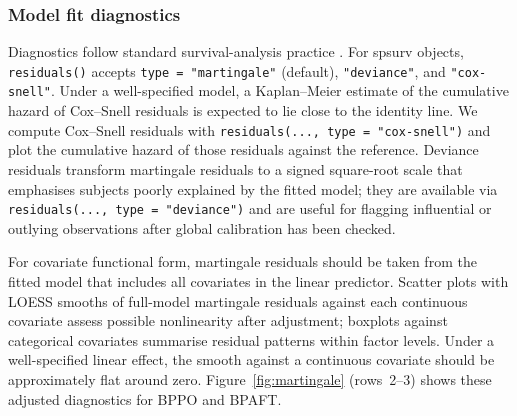 \documentclass[5p,lefttitle]{elsarticle}
\providecommand{\pkg}[1]{\textsf{#1}}
\begin{document}
{%


\subsubsection{Model fit diagnostics}\label{model-fit-diagnostics}

Diagnostics follow standard survival-analysis practice \citep{survival:2000, Collett2015}. For \pkg{spsurv} objects, \texttt{residuals()} accepts
\texttt{type\ =\ "martingale"} (default), \texttt{"deviance"}, and \texttt{"cox-snell"}.
Under a well-specified model, a Kaplan--Meier estimate of the
cumulative hazard of Cox--Snell residuals is expected to lie close to
the identity line. We compute Cox--Snell residuals with
\texttt{residuals(...,\ type\ =\ "cox-snell")} and plot the cumulative hazard of
those residuals against the reference.
Deviance residuals transform martingale residuals to a signed square-root
scale that emphasises subjects poorly explained by the fitted model; they are
available via \texttt{residuals(...,\ type\ =\ "deviance")} and are useful for
flagging influential or outlying observations after global calibration has been
checked.

For covariate functional form, martingale residuals should be taken from
the fitted model that includes all covariates in the linear predictor.
Scatter plots with LOESS smooths of full-model martingale residuals
against each continuous covariate assess possible nonlinearity after
adjustment; boxplots against categorical covariates summarise residual
patterns within factor levels. Under a well-specified linear effect, the
smooth against a continuous covariate should be approximately flat around
zero. Figure~\ref{fig:martingale} (rows~2--3) shows these adjusted
diagnostics for BPPO and BPAFT.

}
\end{document}
